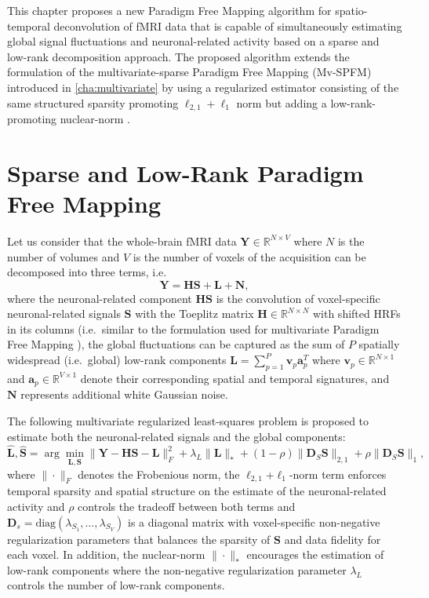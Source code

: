 This chapter proposes a new Paradigm Free Mapping algorithm for spatio-temporal
deconvolution of fMRI data that is capable of simultaneously estimating global
signal fluctuations and neuronal-related activity based on a sparse and low-rank
decomposition approach. The proposed algorithm extends the formulation of the
multivariate-sparse Paradigm Free Mapping (Mv-SPFM)
introduced in \cref{cha:multivariate} by using a regularized estimator
consisting of the same structured sparsity promoting $\ell_{2,1}+\ell_1$ norm
but adding a low-rank-promoting nuclear-norm \citep{Otazo2015Lowrankplus}.

\section{Sparse and Low-Rank Paradigm Free Mapping}
\label{sec:low_rank_lrs_pfm}
Let us consider that the whole-brain fMRI data $\mathbf{Y} \in
\mathbb{R}^{N \times V}$ where $N$ is the number of volumes and $V$ is the
number of voxels of the acquisition can be decomposed into three terms, i.e.\ 
\begin{equation} \label{eq:2}
    \mathbf{Y} = \mathbf{HS} + \mathbf{L} + \mathbf{N},
\end{equation}
where the neuronal-related component $\mathbf{H}\mathbf{S}$ is the convolution
of voxel-specific neuronal-related signals $\mathbf{S}$ with the Toeplitz matrix
$\mathbf{H} \in \mathbb{R}^{N \times N}$ with shifted HRFs in its columns (i.e.\
similar to the formulation used for multivariate Paradigm Free Mapping
\cite{Urunuela2022Wholebrainmultivariate}), the global fluctuations can be
captured as the sum of $P$ spatially widespread (i.e.\ global) low-rank
components $\mathbf{L}=\sum_{p=1}^{P}\mathbf{v}_p\mathbf{a}_p^T$ where
$\mathbf{v}_p \in \mathbb{R}^{N \times 1}$ and $\mathbf{a}_p \in
\mathbb{R}^{V \times 1}$ denote their corresponding spatial and temporal
signatures, and $\mathbf{N}$ represents additional white Gaussian noise.

The following multivariate regularized least-squares problem is proposed to
estimate both the neuronal-related signals and the global components:
\begin{equation} \label{eq:low_rank_inverse_problem}
    \mathbf{\hat{L}}, \mathbf{\hat{S}} = \arg \min_{\mathbf{L}, \mathbf{S}} \| \mathbf{Y} - \mathbf{HS} - \mathbf{L} \|_F^2 + \lambda_L \| \mathbf{L} \|_* 
    + (1 - \rho) \| \mathbf{D}_S \mathbf{S}  \|_{2,1} + \rho \| \mathbf{D}_S \mathbf{S}  \|_1,
\end{equation}
where $\|\cdot\|_F$ denotes the Frobenious norm, the
$\ell_{2,1}$+$\ell_{1}$-norm term enforces temporal sparsity and spatial
structure on the estimate of the neuronal-related activity and $\rho$ controls
the tradeoff between both terms
\citep{Gramfort2011FunctionalBrainImaging,Urunuela2022Wholebrainmultivariate}
and $\mathbf{D}_s=\text{diag}\left(\lambda_{S_1},\ldots,\lambda_{S_V} \right)$
is a diagonal matrix with voxel-specific non-negative regularization parameters
that balances the sparsity of $\mathbf{S}$ and data fidelity for each voxel. In
addition, the nuclear-norm $\|\cdot\|_*$ encourages the estimation of low-rank
components where the non-negative regularization parameter $\lambda_L$ controls
the number of low-rank components.


